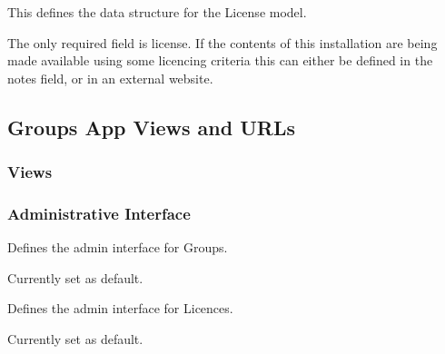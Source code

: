 \documentclass[letterpaper,10pt,english]{sphinxmanual}
\begin{document}

\begin{fulllineitems}
\label{groups:mousedb.groups.models.License}
This defines the data structure for the License model.

The only required field is license.
If the contents of this installation are being made available using some licencing criteria this can either be defined in the notes field, or in an external website.

\end{fulllineitems}



\subsection{Groups App Views and URLs}
\label{groups:groups-app-views-and-urls}

\subsubsection{Views}
\label{groups:module-mousedb.groups.views}\label{groups:views}

\subsubsection{Administrative Interface}
\label{groups:module-mousedb.groups.admin}\label{groups:administrative-interface}

\begin{fulllineitems}
\label{groups:mousedb.groups.admin.GroupAdmin}
Defines the admin interface for Groups.

Currently set as default.

\end{fulllineitems}


\begin{fulllineitems}
\label{groups:mousedb.groups.admin.LicenseAdmin}
Defines the admin interface for Licences.

Currently set as default.

\end{fulllineitems}
\end{document}
